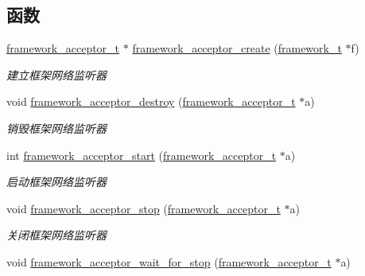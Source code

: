 \subsection*{函数}
\begin{DoxyCompactItemize}
\item 
\hyperlink{a00047_ab0952db3c97c4760192720875e69d040_ab0952db3c97c4760192720875e69d040}{framework\+\_\+acceptor\+\_\+t} $\ast$ \hyperlink{a00050_a09f38093fc07ac67eb32a2d73d01ac00_a09f38093fc07ac67eb32a2d73d01ac00}{framework\+\_\+acceptor\+\_\+create} (\hyperlink{a00047_a6149d769f6f07ed14a40a271c95d8463_a6149d769f6f07ed14a40a271c95d8463}{framework\+\_\+t} $\ast$f)
\begin{DoxyCompactList}\small\item\em 建立框架网络监听器 \end{DoxyCompactList}\item 
void \hyperlink{a00050_a8547ef8ed59bf8fc10ce491cbc2e0e7d_a8547ef8ed59bf8fc10ce491cbc2e0e7d}{framework\+\_\+acceptor\+\_\+destroy} (\hyperlink{a00047_ab0952db3c97c4760192720875e69d040_ab0952db3c97c4760192720875e69d040}{framework\+\_\+acceptor\+\_\+t} $\ast$a)
\begin{DoxyCompactList}\small\item\em 销毁框架网络监听器 \end{DoxyCompactList}\item 
int \hyperlink{a00050_ae7af7233800a87f2719ba257be3fe738_ae7af7233800a87f2719ba257be3fe738}{framework\+\_\+acceptor\+\_\+start} (\hyperlink{a00047_ab0952db3c97c4760192720875e69d040_ab0952db3c97c4760192720875e69d040}{framework\+\_\+acceptor\+\_\+t} $\ast$a)
\begin{DoxyCompactList}\small\item\em 启动框架网络监听器 \end{DoxyCompactList}\item 
void \hyperlink{a00050_a53e38c44cdc8c84a57728a7f8e41dc27_a53e38c44cdc8c84a57728a7f8e41dc27}{framework\+\_\+acceptor\+\_\+stop} (\hyperlink{a00047_ab0952db3c97c4760192720875e69d040_ab0952db3c97c4760192720875e69d040}{framework\+\_\+acceptor\+\_\+t} $\ast$a)
\begin{DoxyCompactList}\small\item\em 关闭框架网络监听器 \end{DoxyCompactList}\item 
void \hyperlink{a00050_a795d492439f49b9e6908404c24daf347_a795d492439f49b9e6908404c24daf347}{framework\+\_\+acceptor\+\_\+wait\+\_\+for\+\_\+stop} (\hyperlink{a00047_ab0952db3c97c4760192720875e69d040_ab0952db3c97c4760192720875e69d040}{framework\+\_\+acceptor\+\_\+t} $\ast$a)

\end{DoxyCompactItemize}
